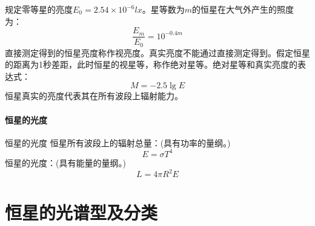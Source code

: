 规定零等星的亮度$E_{0}=2.54\times 10^{-6}lx$。星等数为$m$的恒星在大气外产生的照度为：
\begin{equation}
	\frac{E_{m}}{E_{0}}=10^{-0.4m}
\end{equation}
直接测定得到的恒星亮度称作视亮度。真实亮度不能通过直接测定得到。假定恒星的距离为1秒差距，此时恒星的视星等，称作绝对星等。绝对星等和真实亮度的表达式：
\begin{equation}
	M=-2.5\lg E
\end{equation}
恒星真实的亮度代表其在所有波段上辐射能力。
\paragraph{恒星的光度}
恒星的光度
恒星所有波段上的辐射总量：(具有功率的量纲。)
\begin{equation}
	E=\sigma T^4
\end{equation}
恒星的光度：(具有能量的量纲。)
\begin{equation}
	L=4\pi R^2E
\end{equation}
\section{恒星的光谱型及分类}
